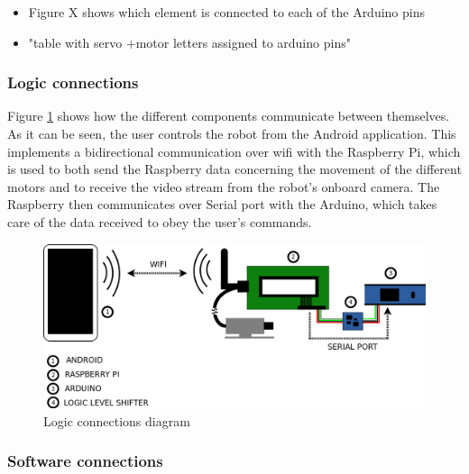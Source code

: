 	\begin{itemize}
	\item Figure X shows which element is connected to each of the Arduino pins

	\item "table with servo +motor letters assigned to arduino pins"
	\end{itemize}



\subsubsection{Logic connections}

Figure \ref{logicDiagram} shows how the different components communicate between themselves. As it can be seen, the user controls the robot from the Android application. This implements a bidirectional communication over wifi with the Raspberry Pi, which is used to both send the Raspberry data concerning the movement of the different motors and to receive the video stream from the robot's onboard camera. The Raspberry then communicates over Serial port with the Arduino, which takes care of the data received to obey the user's commands.\\

	\begin{figure}[H]
			\centering
			\includegraphics[width=15cm, angle=0]{images/Diagrams/logic.png}
			\caption{Logic connections diagram }
			\label{logicDiagram}
	\end{figure}
	\bigskip


\subsubsection{Software connections}

